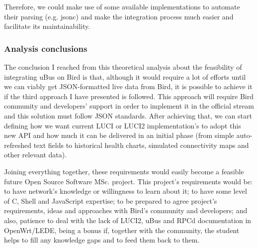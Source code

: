 \begin{enumerate}


Therefore, we could make use of some available implementations to automate their parsing (e.g. \Gls{jsonc}) and make the integration process much easier and facilitate its maintainability.
\end{enumerate}


\subsubsection{Analysis conclusions}
The conclusion I reached from this theoretical analysis about the feasibility of integrating uBus on Bird is that, although it would require a lot of efforts until we can viably get JSON-formatted live data from Bird, it is possible to achieve it if the third approach I have presented is followed. This approach will require Bird community and developers' support in order to implement it in the official stream and this solution must follow JSON standards. After achieving that, we can start defining how we want current LUCI or LUCI2 implementation's to adopt this new API and how much it can be delivered in an initial phase (from simple auto-refreshed text fields to historical health charts, simulated connectivity maps and other relevant data).

Joining everything together, these requirements would easily  become a feasible future Open Source Software MSc. project. This project's requirements would be: to have network's knowledge or willingness to learn about it; to have some level of C, Shell and JavaScript expertise; to be prepared to agree project's requirements, ideas and approaches with Bird's community and developers; and also, patience to deal with the lack of LUCI2, uBus and RPCd documentation in OpenWrt/LEDE, being a bonus if, together with the community, the student helps to fill any knowledge gaps and to feed them back to them.

\newpage